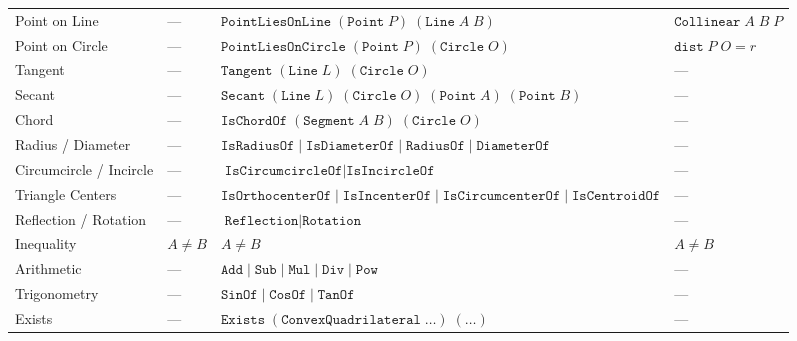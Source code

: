 \documentclass[border=2pt]{standalone}
\begin{document}
\begin{longtable}{@{}p{2.2cm} p{4.5cm} p{4.5cm} p{3cm}@{}}
Point on Line
  & ---
  & $\texttt{PointLiesOnLine}\;(\texttt{Point}\;P)\;(\texttt{Line}\;A\;B)$
  & $\texttt{Collinear}\;A\;B\;P$
  \\

Point on Circle
  & ---
  & $\texttt{PointLiesOnCircle}\;(\texttt{Point}\;P)\;(\texttt{Circle}\;O)$
  & $\texttt{dist}\;P\;O = r$
  \\

Tangent
  & ---
  & $\texttt{Tangent}\;(\texttt{Line}\;L)\;(\texttt{Circle}\;O)$
  & ---
  \\

Secant
  & ---
  & $\texttt{Secant}\;(\texttt{Line}\;L)\;(\texttt{Circle}\;O)\;(\texttt{Point}\;A)\;(\texttt{Point}\;B)$
  & ---
  \\

Chord
  & ---
  & $\texttt{IsChordOf}\;(\texttt{Segment}\;A\;B)\;(\texttt{Circle}\;O)$
  & ---
  \\

Radius / Diameter
  & ---
  & $\texttt{IsRadiusOf}\mid\texttt{IsDiameterOf}\mid\texttt{RadiusOf}\mid\texttt{DiameterOf}$
  & ---
  \\

Circumcircle / Incircle
  & ---
  & $\texttt{IsCircumcircleOf}\mid\texttt{IsIncircleOf}$
  & ---
  \\

Triangle Centers
  & ---
  & $\texttt{IsOrthocenterOf}\mid\texttt{IsIncenterOf}\mid\texttt{IsCircumcenterOf}\mid\texttt{IsCentroidOf}$
  & ---
  \\

Reflection / Rotation
  & ---
  & $\texttt{Reflection}\mid\texttt{Rotation}$
  & ---
  \\

Inequality
  & $A \neq B$
  & $A \neq B$
  & $A \neq B$
  \\

Arithmetic
  & ---
  & $\texttt{Add}\mid\texttt{Sub}\mid\texttt{Mul}\mid\texttt{Div}\mid\texttt{Pow}$
  & ---
  \\

Trigonometry
  & ---
  & $\texttt{SinOf}\mid\texttt{CosOf}\mid\texttt{TanOf}$
  & ---
  \\

Exists
  & ---
  & $\texttt{Exists}\;(\texttt{ConvexQuadrilateral}\;\dots)\;(\dots)$
  & ---
  \\

\end{longtable}
\end{document}
